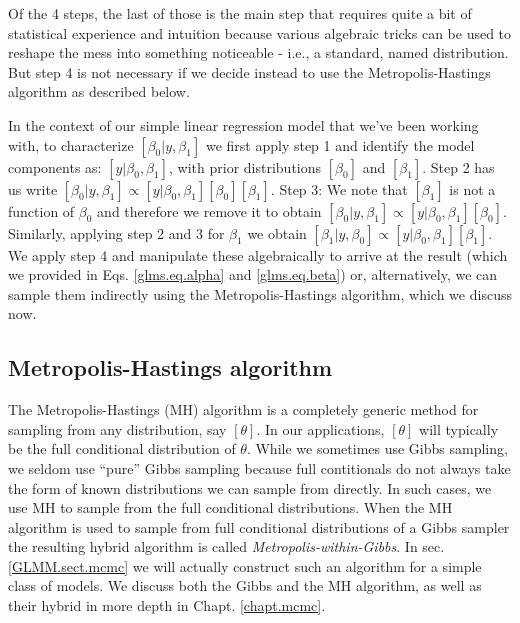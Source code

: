 
Of the 4 steps, the last of those is the main step that requires quite
a bit of statistical experience and intuition because various
algebraic tricks can be used to reshape the mess into something
noticeable - i.e., a standard, named distribution. But step 4 is not
necessary if we decide instead to use the Metropolis-Hastings algorithm
as described below.

In the context of our simple linear regression model that we've been 
working with, to characterize $[\beta_0|y,\beta_1]$ we first apply step 1
and identify the model components as: $[y|\beta_0, \beta_1]$, with
prior distributions $[\beta_0]$
and $[\beta_1]$. Step 2 has us write $[\beta_0|y,\beta_1] \propto
[y|\beta_0,\beta_1][\beta_0][\beta_1]$.  Step 3: We note that $[\beta_1]$ is not a
function of $\beta_0$ and therefore we remove it to obtain $[\beta_0|y,\beta_1]
\propto [y|\beta_0,\beta_1][\beta_0]$. Similarly, applying step 2 and 3 for $\beta_1$ we obtain $[\beta_1|y,\beta_0]
\propto [y|\beta_0,\beta_1][\beta_1]$. We apply step 4 and manipulate
these algebraically to arrive at the result (which we provided in
Eqs. \ref{glms.eq.alpha} and \ref{glms.eq.beta}) or, alternatively, we can
sample them indirectly using the Metropolis-Hastings algorithm, which we 
discuss now.


\subsection{Metropolis-Hastings algorithm}

The Metropolis-Hastings (MH) algorithm is a completely generic method for
sampling from any distribution, say $[\theta]$. In our applications,
$[\theta]$ will typically be the full conditional distribution of
$\theta$.
While we sometimes use Gibbs sampling, we seldom
use ``pure'' Gibbs sampling because full contitionals do not always take the form of known distributions we can sample from directly. In such cases, we use MH to sample from the full conditional distributions.
When the MH algorithm is used to sample from  full
conditional distributions of a Gibbs sampler the resulting hybrid algorithm is
called
 {\it Metropolis-within-Gibbs}.
In sec. \ref{GLMM.sect.mcmc} we will
actually construct such an algorithm for a simple class of models. We discuss both the Gibbs and the MH algorithm, as well as their hybrid in more depth in Chapt. \ref{chapt.mcmc}.

